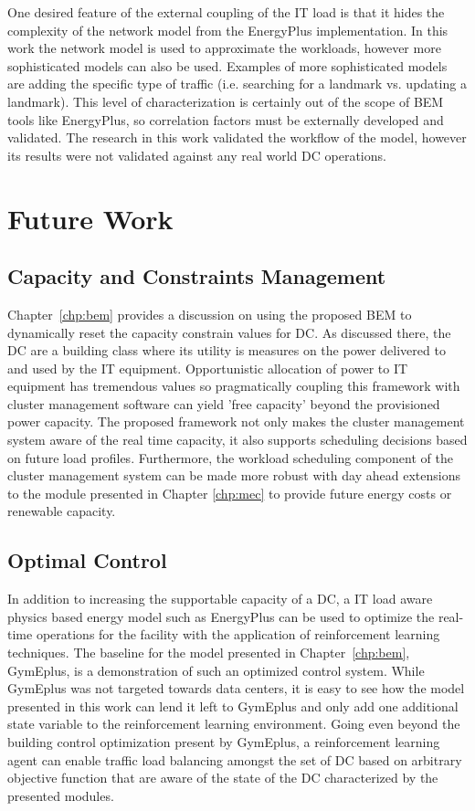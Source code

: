 One desired feature of the external coupling of the IT load is that it hides the complexity of the network model from the EnergyPlus implementation. In this work the network model is used to approximate the workloads, however more sophisticated models can also be used. Examples of more sophisticated models are adding the specific type of traffic (i.e. searching for a landmark vs. updating a landmark). This level of characterization is certainly out of the scope of BEM tools like EnergyPlus, so correlation factors must be externally developed and validated. The research in this work validated the workflow of the model, however its results were not validated against any real world DC operations. 


\section{Future Work}
\subsection{Capacity and Constraints Management}
Chapter~\ref{chp:bem} provides a discussion on using the proposed BEM to dynamically reset the capacity constrain values for DC. As discussed there, the DC are a building class where its utility is measures on the power delivered to and used by the IT equipment. Opportunistic allocation of power to IT equipment has tremendous values so pragmatically coupling this framework with cluster management software can yield 'free capacity' beyond the provisioned power capacity. The proposed framework not only makes the cluster management system aware of the real time capacity, it also supports scheduling decisions based on future load profiles. Furthermore, the workload scheduling component of the cluster management system can be made more robust with day ahead extensions to the module presented in Chapter \ref{chp:mec} to provide future energy costs or renewable capacity.


\subsection{Optimal Control}
In addition to increasing the supportable capacity of a DC, a IT load aware physics based energy model such as EnergyPlus can be used to optimize the real-time operations for the facility with the application of reinforcement learning techniques. The baseline for the model presented in Chapter~\ref{chp:bem}, GymEplus, is a demonstration of such an optimized control system. While GymEplus was not targeted towards data centers, it is easy to see how the model presented in this work can lend it left to GymEplus and only add one additional state variable to the reinforcement learning environment. Going even beyond the building control optimization present by GymEplus, a reinforcement learning agent can enable traffic load balancing amongst the set of DC based on arbitrary objective function that are aware of the state of the DC characterized by the presented modules. 



